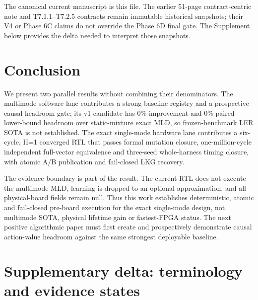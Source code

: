 \documentclass[11pt]{article}
\begin{document}
The canonical current manuscript is this file.  The earlier 51-page
contract-centric note and T7.1.1--T7.2.5 contracts remain immutable historical
snapshots; their V4 or Phase 6C claims do not override the Phase 6D final gate.
The Supplement below provides the delta needed to interpret those snapshots.

\section{Conclusion}

We present two parallel results without combining their denominators.  The
multimode software lane contributes a strong-baseline registry and a
prospective causal-headroom gate; its v1 candidate has 0\% improvement and 0\%
paired lower-bound headroom over static-mixture exact MLD, so frozen-benchmark
LER SOTA is not established.  The exact single-mode hardware lane contributes
a six-cycle, II=1 converged RTL that passes formal mutation closure,
one-million-cycle independent full-vector equivalence and three-seed
whole-harness timing closure, with atomic A/B publication and fail-closed LKG
recovery.

The evidence boundary is part of the result.  The current RTL does not execute
the multimode MLD, learning is dropped to an optional approximation, and all
physical-board fields remain null.  Thus this work establishes deterministic,
atomic and fail-closed pre-board execution for the exact single-mode design,
not multimode SOTA, physical lifetime gain or fastest-FPGA status.  The next
positive algorithmic paper must first create and prospectively demonstrate
causal action-value headroom against the same strongest deployable baseline.

\clearpage
\appendix

\section{Supplementary delta: terminology and evidence states}
\end{document}
